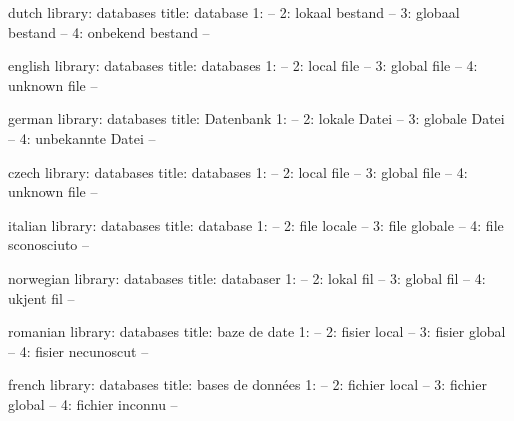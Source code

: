 


\startmessages  dutch  library: databases
  title: database
      1: --
      2: lokaal bestand --
      3: globaal bestand --
      4: onbekend bestand --
\stopmessages

\startmessages  english  library: databases
  title: databases
      1: --
      2: local file --
      3: global file --
      4: unknown file --
\stopmessages

\startmessages  german  library: databases
  title: Datenbank
      1: --
      2: lokale Datei --
      3: globale Datei --
      4: unbekannte Datei --
\stopmessages


\startmessages  czech library: databases
  title: databases
      1: --
      2: local file --
      3: global file --
      4: unknown file --
\stopmessages

\startmessages  italian  library: databases
  title: database
      1: --
      2: file locale --
      3: file globale --
      4: file sconosciuto --
\stopmessages

\startmessages  norwegian  library: databases
  title: databaser
      1: --
      2: lokal fil --
      3: global fil --
      4: ukjent fil --
\stopmessages

\startmessages  romanian  library: databases
  title: baze de date
      1: --
      2: fisier local --
      3: fisier global --
      4: fisier necunoscut --
\stopmessages

\startmessages  french  library: databases
  title: bases de données
      1: --
      2: fichier local --
      3: fichier global --
      4: fichier inconnu --
\stopmessages

\unprotect

